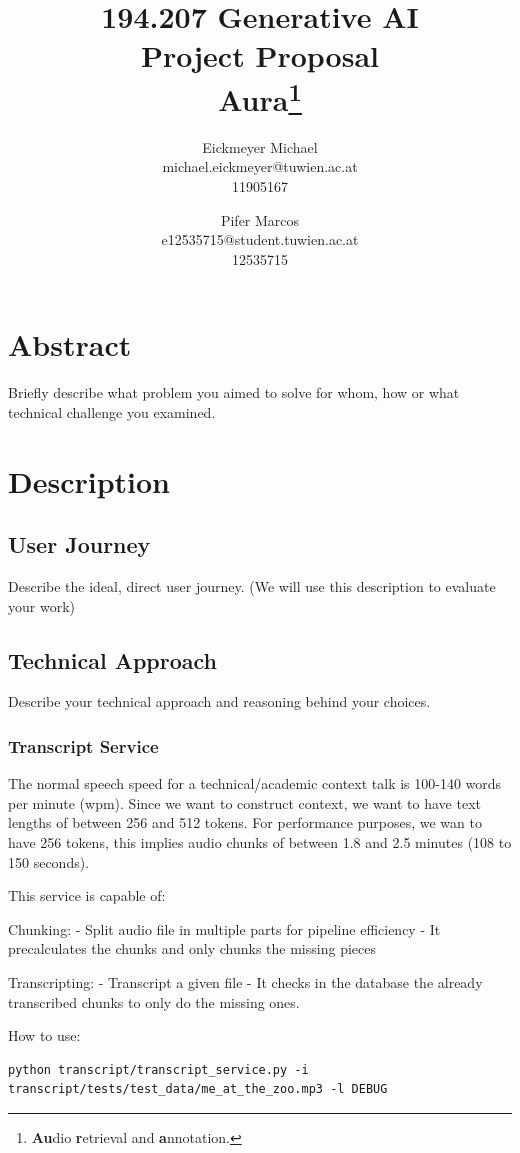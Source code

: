 \documentclass{article}
\title{
    \small{194.207 Generative AI}\\
    \Large{\textbf{Project Proposal}}\\
    \vspace{2mm}
    \Large{\textbf{Aura\footnote{\textbf{Au}dio \textbf{r}etrieval and \textbf{a}nnotation.}}}\\
}
\author{
    Eickmeyer Michael\\
    \small{michael.eickmeyer@tuwien.ac.at}\\
    \small{11905167}
    \and
    Pifer Marcos\\
    \small{e12535715@student.tuwien.ac.at}\\
    \small{12535715}
}
\begin{document}
\maketitle

\section{Abstract}
Briefly describe what problem you aimed to solve for whom, how or what technical challenge you examined.

\section{Description}
\subsection{User Journey}
Describe the ideal, direct user journey. (We will use this description to evaluate your work)

\subsection{Technical Approach}
Describe your technical approach and reasoning behind your choices.

\subsubsection{Transcript Service}

The normal speech speed for a technical/academic context talk is 100-140 words
per minute (wpm). Since we want to construct context, we want to have text lengths
of between 256 and 512 tokens. For performance purposes, we wan to have 256 tokens,
this implies audio chunks of between 1.8 and 2.5 minutes (108 to 150 seconds).

This service is capable of:

Chunking:
        - Split audio file in multiple parts for pipeline efficiency
        - It precalculates the chunks and only chunks the missing pieces

Transcripting:
        - Transcript a given file
        - It checks in the database the already transcribed chunks to only do
        the missing ones.

How to use:

\begin{verbatim}
python transcript/transcript_service.py -i transcript/tests/test_data/me_at_the_zoo.mp3 -l DEBUG
\end{verbatim}
\end{document}

